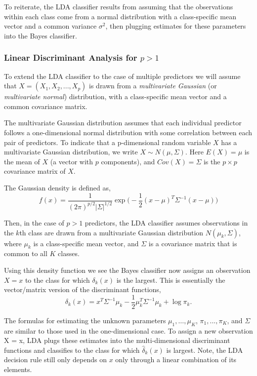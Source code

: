 \documentclass{article}
\numberwithin{equation}{section}
\begin{document}
\begin{enumerate}
To reiterate, the LDA classifier results from assuming that the observations within each class come from a normal distribution with a class-specific mean vector and a common variance $\sigma^2$, then plugging estimates for these parameters into the Bayes classifier. 

\subsubsection{Linear Discriminant Analysis for \texorpdfstring{$p>1$}{p greater than 1}}
To extend the LDA classifier to the case of multiple predictors we will assume that $X = (X_1, X_2,...,X_p)$ is drawn from a \textit{multivariate Gaussian} (or \textit{multivariate normal}) distribution, with a class-specific mean vector and a common covariance matrix.

The multivariate Gaussian distribution assumes that each individual predictor follows a one-dimensional normal distribution with some correlation between each pair of predictors. To indicate that a p-dimensional random variable $X$ has a multivariate Gaussian distribution, we write $X \sim N(\mu, \Sigma)$. Here $E(X) = \mu$ is the mean of $X$ (a vector with $p$ components), and $Cov(X) = \Sigma$ is the $p \times p$ covariance matrix of $X$. 

The Gaussian density is defined as,
\begin{equation}
    f(x) = \frac{1}{(2\pi)^{p/2} |\Sigma|^{1/2}} \exp \Bigg( -\frac{1}{2} (x-\mu)^T \Sigma^{-1} (x-\mu) \Bigg)
\end{equation}

Then, in the case of $p > 1$ predictors, the LDA classifier assumes observations in the $k$th class are drawn from a multivariate Gaussian distribution $N(\mu_k, \Sigma)$, where $\mu_k$ is a class-specific mean vector, and $\Sigma$ is a covariance matrix that is common to all $K$ classes.


Using this density function we see the Bayes classifier now assigns an observation $X = x$ to the class for which $\delta_k(x)$ is the largest. This is essentially the vector/matrix version of the discriminant functions,
\begin{equation}
    \delta_k(x) = x^T \Sigma^{-1}\mu_k - \frac{1}{2} \mu_k^T \Sigma^{-1}\mu_k + \log \pi_k.
\end{equation}

The formulas for estimating the unknown parameters $\mu_1,\dots,\mu_K$, $\pi_1,...,\pi_K$, and $\Sigma$ are similar to those used in the one-dimensional case. To assign a new observation X = x, LDA plugs these estimates into the multi-dimensional discriminant functions and classifies to the class for which
$\hat \delta_k(x)$ is largest. Note, the LDA decision rule still only depends on $x$ only through a linear combination of its elements.


\end{enumerate}
\end{document}
